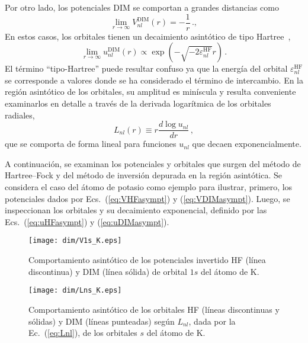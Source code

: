 Por otro lado, los potenciales DIM se comportan a grandes distancias 
como
\begin{equation}
\lim_{r\rightarrow\infty} V_{nl}^{\mathrm{DIM}}(r) = -\frac{1}{r}\,.,\label{eq:VDIMasympt}
\end{equation}
En estos casos, los orbitales tienen un decaimiento asintótico de tipo 
Hartree~\cite{Casida:89},
\begin{equation}
\lim_{r \rightarrow \infty} u_{nl}^{\mathrm{DIM}}(r) \propto
\exp(- \sqrt{- 2 \varepsilon_{nl}^{\mathrm{HF}} } r ) \,.
\label{eq:uDIMasympt}
\end{equation}
El término ``tipo-Hartree'' puede resultar confuso ya que la energía 
del orbital $\varepsilon_{nl}^{\mathrm{HF}}$ se corresponde a valores 
donde se ha considerado el término de intercambio. 
En la región asintótico de los orbitales, su amplitud es miníscula y 
resulta conveniente examinarlos en detalle a través de la derivada 
logarítmica de los orbitales radiales, 
\begin{equation}
L_{nl}(r) \equiv r \frac{d \log{u_{nl}}}{d r}\,,
\label{eq:Lnl}
\end{equation}
que se comporta de forma lineal para funciones $u_{nl}$ que decaen 
exponencialmente. 

A continuación, se examinan los potenciales y orbitales que surgen del 
método de Hartree--Fock y del método de inversión depurada en la región 
asintótica. Se considera el caso del átomo de potasio como ejemplo para 
ilustrar, primero, los potenciales dados por Ecs.~(\ref{eq:VHFasympt}) y 
(\ref{eq:VDIMasympt}). Luego, se inspeccionan los orbitales y su 
decaimiento exponencial, definido por las Ecs.~(\ref{eq:uHFasympt}) y 
(\ref{eq:uDIMasympt}).

\begin{figure}
\centering
\texttt{[image: dim/V1s\_K.eps]} 
\vspace{-0.45cm}
\caption[Comportamiento asintótico de los potenciales.]
{Comportamiento asintótico de los potenciales invertido HF (línea discontinua) y DIM (línea sólida) de orbital $1s$ del átomo de K.}
\label{fig:V1sK}

\vspace{0.45cm}
\texttt{[image: dim/Lns\_K.eps]} 
\vspace{-0.45cm}
\caption[Comportamiento asintótico de los orbitales HF.]
{Comportamiento asintótico de los orbitales HF (líneas discontinuas y 
sólidas) y DIM (líneas punteadas) según $L_{nl}$, dada por la 
Ec.~(\ref{eq:Lnl}), de los orbitales $s$ del átomo de K.}
\label{fig:LnsK}
\end{figure}

